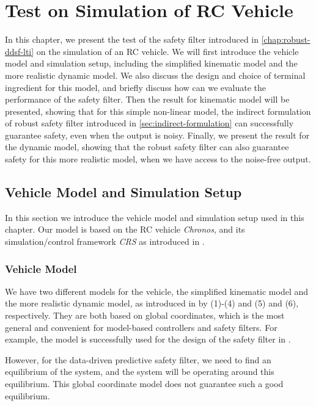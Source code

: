 \chapter{Test on Simulation of RC Vehicle}\label{chap:test-chronos}

In this chapter, we present the test of the safety filter introduced in \cref{chap:robust-ddsf-lti} on the simulation of an RC vehicle.
We will first introduce the vehicle model and simulation setup, including the simplified kinematic model and the more realistic dynamic model.
We also discuss the design and choice of terminal ingredient for this model, and briefly discuss how can we evaluate the performance of the safety filter.
Then the result for kinematic model will be presented, showing that for this simple non-linear model, the indirect formulation of robust safety filter introduced in \cref{sec:indirect-formulation} can successfully guarantee safety, even when the output is noisy.
Finally, we present the result for the dynamic model, showing that the robust safety filter can also guarantee safety for this more realistic model, when we have access to the noise-free output.


\section{Vehicle Model and Simulation Setup}\label{sec:model-sim-setup}

In this section we introduce the vehicle model and simulation setup used in this chapter.
Our model is based on the RC vehicle \emph{Chronos}, and its simulation/control framework \emph{CRS} as introduced in \cite{carronChronosCRSDesign2022}.

\subsection{Vehicle Model}\label{subsec:vehicle-model}

We have two different models for the vehicle, the simplified kinematic model and the more realistic dynamic model, as introduced in \cite{carronChronosCRSDesign2022} by (1)-(4) and (5) and (6), respectively.
They are both based on global coordinates, which is the most general and convenient for model-based controllers and safety filters.
For example, the model is successfully used for the design of the safety filter in \cite{tearlePredictiveSafetyFilterRacing2021}.

However, for the data-driven predictive safety filter, we need to find an equilibrium of the system, and the system will be operating around this equilibrium.
This global coordinate model does not guarantee such a good equilibrium.

